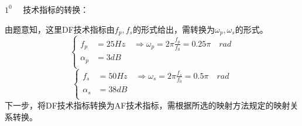 \documentclass[notheorems,compress,mathserif,table]{beamer}
\begin{document}
\begin{frame}[allowframebreaks]\frametitle{}%
\quad\newline\quad
$1^0\quad$ 技术指标的转换：
\quad\newline\quad
  \par 由题意知，这里DF技术指标由$f_p,f_s$的形式给出，需转换为$\omega_p,\omega_s$的形式。
  $$
  \left\{ \begin{aligned}
      f_p      &= 25Hz\quad\Longrightarrow
                  \omega_p = 2\pi \frac{f_p}{f_0} = 0.25\pi\quad rad\\
      \alpha_p &= 3 dB  \\
      \end{aligned} \right.
  $$
  $$
  \left\{ \begin{aligned}
      f_s      &= 50Hz\quad\Longrightarrow
                  \omega_s = 2\pi \frac{f_s}{f_0} = 0.5\pi\quad rad\\
      \alpha_s &= 38 dB  \\
      \end{aligned} \right.
  $$
  \newpage
  \quad\newline\quad
  下一步，将DF技术指标转换为AF技术指标，需根据所选的映射方法规定的映射关系转换。


\end{frame}
\end{document}
